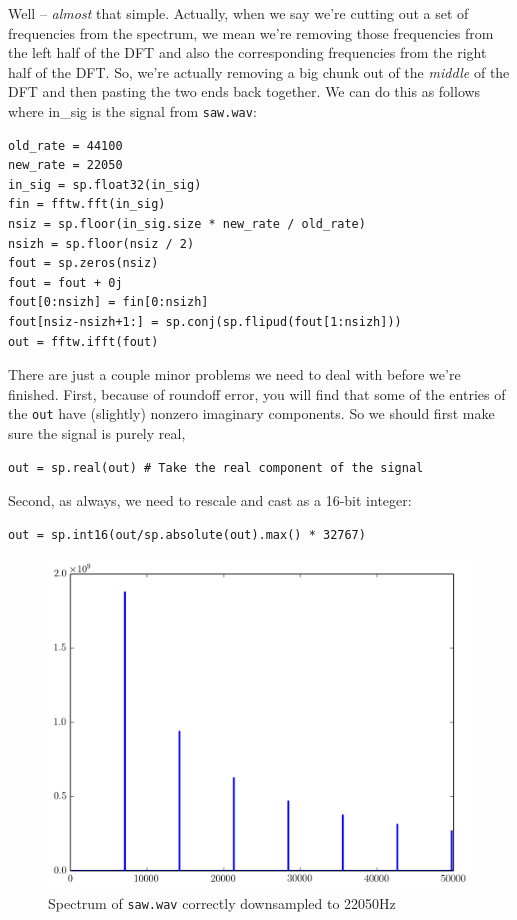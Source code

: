 Well -- \emph{almost} that simple. Actually, when we say we're cutting out a set of frequencies from the spectrum, we mean we're removing those frequencies from the left half of the DFT and also the corresponding frequencies from the right half of the DFT. So, we're actually removing a big chunk out of the \emph{middle} of the DFT and then pasting the two ends back together. We can do this as follows where in\_sig is the signal from \texttt{saw.wav}:
\begin{lstlisting}
old_rate = 44100
new_rate = 22050
in_sig = sp.float32(in_sig)
fin = fftw.fft(in_sig)
nsiz = sp.floor(in_sig.size * new_rate / old_rate)
nsizh = sp.floor(nsiz / 2)
fout = sp.zeros(nsiz)
fout = fout + 0j
fout[0:nsizh] = fin[0:nsizh]
fout[nsiz-nsizh+1:] = sp.conj(sp.flipud(fout[1:nsizh]))
out = fftw.ifft(fout)
\end{lstlisting}
There are just a couple minor problems we need to deal with before we're finished.
First, because of roundoff error, you will find that some of the entries of the \texttt{out} have (slightly) nonzero imaginary components.
So we should first make sure the signal is purely real,
\begin{lstlisting}
out = sp.real(out) # Take the real component of the signal
\end{lstlisting}
Second, as always, we need to rescale and cast as a 16-bit integer:
\begin{lstlisting}
out = sp.int16(out/sp.absolute(out).max() * 32767)
\end{lstlisting}


\begin{figure}[ht]\caption{Spectrum of \texttt{saw.wav} correctly downsampled to 22050Hz}\label{sawspecdown2}\centering\includegraphics[width=\textwidth]{sawdownspec}\end{figure}

